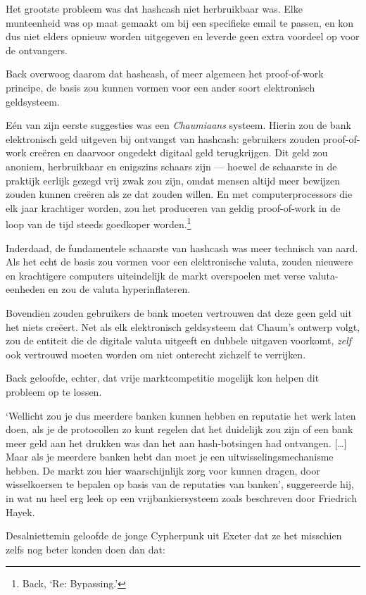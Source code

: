 \documentclass[
  a5paper,
  smalldemyvopaper,11pt,twoside,onecolumn,openright,extrafontsizes]{memoir}
\begin{document}
Het grootste probleem was dat hashcash niet herbruikbaar was. Elke
munteenheid was op maat gemaakt om bij een specifieke email te passen,
en kon dus niet elders opnieuw worden uitgegeven en leverde geen extra
voordeel op voor de ontvangers.

Back overwoog daarom dat hashcash, of meer algemeen het proof-of-work
principe, de basis zou kunnen vormen voor een ander soort elektronisch
geldsysteem.

Eén van zijn eerste suggesties was een \emph{Chaumiaans} systeem. Hierin
zou de bank elektronisch geld uitgeven bij ontvangst van hashcash:
gebruikers zouden proof-of-work creëren en daarvoor ongedekt digitaal
geld terugkrijgen. Dit geld zou anoniem, herbruikbaar en enigszins
schaars zijn --- hoewel de schaarste in de praktijk eerlijk gezegd vrij
zwak zou zijn, omdat mensen altijd meer bewijzen zouden kunnen creëren
als ze dat zouden willen. En met computerprocessors die elk jaar
krachtiger worden, zou het produceren van geldig proof-of-work in de
loop van de tijd steeds goedkoper worden.\footnote{Back, `Re:
  Bypassing.'}

Inderdaad, de fundamentele schaarste van hashcash was meer technisch van
aard. Als het echt de basis zou vormen voor een elektronische valuta,
zouden nieuwere en krachtigere computers uiteindelijk de markt
overspoelen met verse valuta-eenheden en zou de valuta hyperinflateren.

Bovendien zouden gebruikers de bank moeten vertrouwen dat deze geen geld
uit het niets creëert. Net als elk elektronisch geldsysteem dat Chaum's
ontwerp volgt, zou de entiteit die de digitale valuta uitgeeft en
dubbele uitgaven voorkomt, \emph{zelf} ook vertrouwd moeten worden om
niet onterecht zichzelf te verrijken.

Back geloofde, echter, dat vrije marktcompetitie mogelijk kon helpen dit
probleem op te lossen.

`Wellicht zou je dus meerdere banken kunnen hebben en reputatie het werk
laten doen, als je de protocollen zo kunt regelen dat het duidelijk zou
zijn of een bank meer geld aan het drukken was dan het aan
hash-botsingen had ontvangen. {[}\ldots{]} Maar als je meerdere banken
hebt dan moet je een uitwisselingsmechanisme hebben. De markt zou hier
waarschijnlijk zorg voor kunnen dragen, door wisselkoersen te bepalen op
basis van de reputaties van banken', suggereerde hij, in wat nu heel erg
leek op een vrijbankiersysteem zoals beschreven door Friedrich Hayek.

Desalniettemin geloofde de jonge Cypherpunk uit Exeter dat ze het
misschien zelfs nog beter konden doen dan dat:
\end{document}
